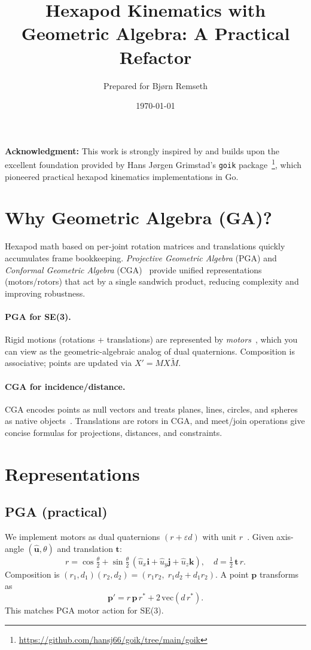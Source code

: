 \documentclass[11pt]{article}
\title{Hexapod Kinematics with Geometric Algebra: A Practical Refactor}
\author{Prepared for Bj\o rn Remseth}
\date{\today}
\begin{document}
\maketitle

\noindent\textbf{Acknowledgment:} This work is strongly inspired by and builds upon the excellent foundation provided by Hans Jørgen Grimstad's \texttt{goik} package~\footnote{\url{https://github.com/hansj66/goik/tree/main/goik}}, which pioneered practical hexapod kinematics implementations in Go.

\section{Why Geometric Algebra (GA)?}
Hexapod math based on per-joint rotation matrices and translations quickly accumulates frame bookkeeping.
\emph{Projective Geometric Algebra} (PGA) and \emph{Conformal Geometric Algebra} (CGA)~\cite{dorst2009gacs} provide unified representations (motors/rotors) that act by a single sandwich product, reducing complexity and improving robustness.

\paragraph{PGA for SE(3).}
Rigid motions (rotations + translations) are represented by \emph{motors}~\cite{gunn2011pga}, which you can view as the geometric-algebraic analog of dual quaternions. Composition is associative; points are updated via $X' = M X \tilde{M}$.

\paragraph{CGA for incidence/distance.}
CGA encodes points as null vectors and treats planes, lines, circles, and spheres as native objects~\cite{dorst2009gacs}. Translations are rotors in CGA, and meet/join operations give concise formulas for projections, distances, and constraints.

\section{Representations}
\subsection{PGA (practical)}
We implement motors as dual quaternions $(r + \varepsilon d)$ with unit $r$~\cite{kavan2008dq}.
Given axis-angle $(\mathbf{\hat{u}}, \theta)$ and translation $\mathbf{t}$:
\[
r = \cos \tfrac{\theta}{2} + \sin \tfrac{\theta}{2} \, (\hat{u}_x \mathbf{i} + \hat{u}_y \mathbf{j} + \hat{u}_z \mathbf{k}),\quad
d = \tfrac{1}{2} \, \mathbf{t}\, r.
\]
Composition is $(r_1, d_1)(r_2, d_2) = (r_1 r_2,\; r_1 d_2 + d_1 r_2)$.
A point $\mathbf{p}$ transforms as
\[
\mathbf{p}' = r\,\mathbf{p}\,r^* + 2\,\mathrm{vec}(d\,r^*).
\]
This matches PGA motor action for SE(3).
\end{document}
